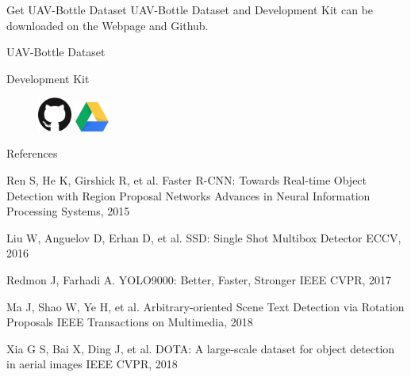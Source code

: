 \documentclass[newPxFont, fullfooter, sectionpages, progressbar]{beamer}
\begin{document}
\begin{frame}[c]{Get UAV-Bottle Dataset}
	\vspace{10mm}
	UAV-Bottle Dataset and Development Kit can be downloaded on the Webpage and Github. \\
\vspace{1em}
\begin{center}
	\large{UAV-Bottle Dataset}

	\large{Development Kit}
	\vspace{1.5em}

	\begin{figure}
		\centerline{
			\includegraphics[width=0.1\textwidth]{images/GitHub-Mark-120px-plus.png}
			\hspace{1.5cm}
			\includegraphics[width=0.1\textwidth]{images/Google_Drive_Logo.png}
			}
	\end{figure}
	
\end{center}
\end{frame}



\begin{frame}{References}
	\begin{thebibliography}{10}
	\scriptsize
	
	
	\beamertemplatearticlebibitems
	Ren S, He K, Girshick R, et al.
	\newblock Faster R-CNN: Towards Real-time Object Detection with Region Proposal Networks
	\newblock Advances in Neural Information Processing Systems, 2015
	
	\beamertemplatearticlebibitems
	Liu W, Anguelov D, Erhan D, et al.
	\newblock SSD: Single Shot Multibox Detector
	\newblock ECCV, 2016
	
	\beamertemplatearticlebibitems
	Redmon J, Farhadi A.
	\newblock YOLO9000: Better, Faster, Stronger
	\newblock IEEE CVPR, 2017

	\beamertemplatearticlebibitems
	Ma J, Shao W, Ye H, et al.
	\newblock Arbitrary-oriented Scene Text Detection via Rotation Proposals
	\newblock IEEE Transactions on Multimedia, 2018
	

	\beamertemplatearticlebibitems
	Xia G S, Bai X, Ding J, et al.
	\newblock DOTA: A large-scale dataset for object detection in aerial images
	\newblock IEEE CVPR, 2018
	
	
  \end{thebibliography}
\end{frame}
\end{document}
